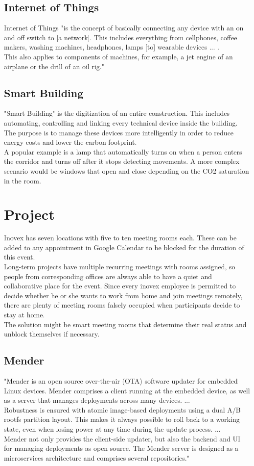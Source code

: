 \subsection{Internet of Things}
Internet of Things "is the concept of basically connecting any device with an on and off switch to [a network]. This includes everything from cellphones, coffee makers, washing machines, headphones, lamps [to] wearable devices ... .\\
This also applies to components of machines, for example, a jet engine of an airplane or the drill of an oil rig."\cite{forbes-iot}
\newpage
\subsection{Smart Building}
"Smart Building" is the digitization of an entire construction. This includes automating, controlling and linking every technical device inside the building. The purpose is to manage these devices more intelligently in order to reduce energy costs and lower the carbon footprint.\cite{kiwi-sb}\\
A popular example is a lamp that automatically turns on when a person enters the corridor and turns off after it stops detecting movements. A more complex scenario would be windows that open and close depending on the CO2 saturation in the room.

\section{Project}
Inovex has seven locations with five to ten meeting rooms each. These can be added to any appointment in Google Calendar to be blocked for the duration of this event.\\
Long-term projects have multiple recurring meetings with rooms assigned, so people from corresponding offices are always able to have a quiet and collaborative place for the event. Since every inovex employee is permitted to decide whether he or she wants to work from home and join meetings remotely, there are plenty of meeting rooms falsely occupied when participants decide to stay at home.\\
The solution might be smart meeting rooms that determine their real status and unblock themselves if necessary.

\subsection{Mender}
"Mender is an open source over-the-air (OTA) software updater for embedded Linux devices. Mender comprises a client running at the embedded device, as well as a server that manages deployments across many devices. ...\\
Robustness is ensured with atomic image-based deployments using a dual A/B rootfs partition layout. This makes it always possible to roll back to a working state, even when losing power at any time during the update process. ...\\
Mender not only provides the client-side updater, but also the backend and UI for managing deployments as open source. The Mender server is designed as a microservices architecture and comprises several repositories."\cite{mender-github}
\newpage

